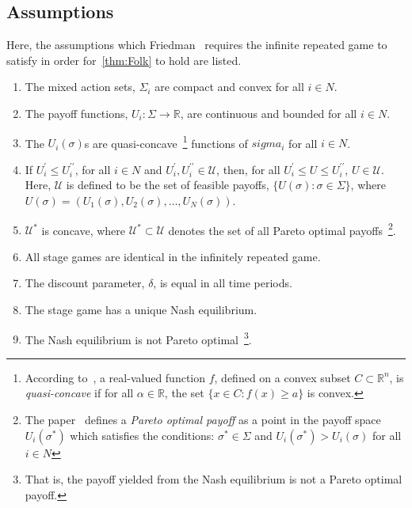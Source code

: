 \subsection{Assumptions}\label{subsec:Assumptions}
Here, the assumptions which Friedman~\cite{friedman1971non} requires the
infinite repeated game to satisfy in order for~\autoref{thm:Folk} to hold are listed.
\begin{enumerate}
    \item The mixed action sets, \(\Sigma_{i}\) are compact and convex for all
    \(i\in N\). 

    \item The payoff functions, \(U_{i}: \Sigma \to \mathbb{R}\), are continuous
    and bounded for all \(i\in N\).

    \item The \(U_{i}(\sigma)\)s are quasi-concave~\footnote{According
    to~\cite{Stover}, a real-valued function \(f\), defined on a convex subset
    \(C \subset \mathbb{R}^n\), is \textit{quasi-concave} if for all \(\alpha
    \in \mathbb{R}\), the set \( \{ x \in C : f(x) \ge a \} \) is convex.}
    functions of \(sigma_{i}\) for all \(i\in N\).

    \item If  \(U_{i}^{\prime} \le U_{i}^{\prime\prime}\), for all \(i\in N\)
    and \(U_{i}^{\prime}, U_{i}^{\prime\prime} \in \mathcal{U}\), then, for all
    \(U_{i}^{\prime} \le U \le U_{i}^{\prime\prime}\), \(U \in \mathcal{U}\). Here, \(\mathcal{U}\)
    is defined to be the set of feasible payoffs, \( \{ U(\sigma) : \sigma \in
    \Sigma \} \), where \(U(\sigma) = (U_{1}(\sigma), U_{2}(\sigma), \ldots,
    U_{N}(\sigma))\).

    \item \(\mathcal{U}^{*}\) is concave, where \(\mathcal{U}^{*} \subset \mathcal{U}\) denotes the
    set of all Pareto optimal payoffs~\footnote{The paper~\cite{friedman1971non} defines a
    \textit{Pareto optimal payoff} as a point in the payoff space
    \(U_{i}(\sigma^{*})\) which satisfies the conditions: \(\sigma^{*} \in
    \Sigma \) and \(U_{i}(\sigma^{*}) > U_{i}(\sigma)\) for all \(i \in N\)}.

    \item All stage games are identical in the infinitely repeated game.

    \item The discount parameter, \(\delta \), is equal in all time periods.
    
    \item The stage game has a unique Nash equilibrium.

    \item The Nash equilibrium is not Pareto optimal~\footnote{That is, the
    payoff yielded from the Nash equilibrium is not a Pareto optimal payoff.}. 
\end{enumerate}

